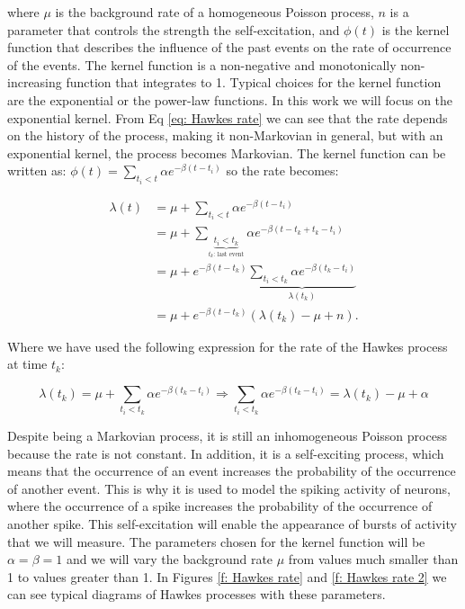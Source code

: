 where $\mu$ is the background rate of a homogeneous Poisson process, $n$ is a parameter that controls the strength the self-excitation, and $\phi(t)$ is the kernel function that
describes the influence of the past events on the rate of occurrence of the events. The kernel function is a non-negative and monotonically non-increasing function that integrates to 1.
Typical choices for the kernel function are the exponential or the power-law functions. In this work we will focus on the exponential kernel. 
From Eq \ref{eq: Hawkes rate} we can see that the rate depends on the history of the process, making it non-Markovian in general, but with an exponential kernel, the process becomes
Markovian. The kernel function can be written as: $\phi(t)=\sum_{t_i<t}\alpha e^{-\beta(t-t_i)}$ so the rate becomes:

\begin{equation}
    \begin{split}
        \lambda(t) &= \mu + \sum_{t_i<t}\alpha e^{-\beta(t-t_i)}\\
        &= \mu + \sum_{\underbrace{t_i<t_k}_{t_k\text{: last event}}}\alpha e^{-\beta(t-t_k+t_k-t_i)}\\
        &= \mu + e^{-\beta(t-t_k)}\underbrace{\sum_{t_i<t_k}\alpha e^{-\beta(t_k-t_i)}}_{\lambda(t_k)}\\
        &= \mu + e^{-\beta(t-t_k)}\left( \lambda(t_k)-\mu+n \right).
    \end{split}
    \label{eq: Hawkes rate exponential becomes Markovian}
\end{equation}

Where we have used the following expression for the rate of the Hawkes process at time $t_k$:

\begin{equation}
    \lambda(t_k) =\mu+\sum_{t_i<t_k}\alpha e^{-\beta(t_k-t_i)}\Rightarrow\sum_{t_i<t_k}\alpha e^{-\beta(t_k-t_i)} = \lambda(t_k)-\mu+\alpha
    \label{eq: Hawkes rate at event time}
\end{equation}

Despite being a Markovian process, it is still an inhomogeneous Poisson process because the rate is not constant. In addition, it is a self-exciting process, which means that the occurrence
of an event increases the probability of the occurrence of another event. This is why it is used to model the spiking activity of neurons, where the occurrence of a spike increases the
probability of the occurrence of another spike. This self-excitation will enable the appearance of bursts of activity that we will measure. The parameters chosen for the kernel function 
will be $\alpha=\beta=1$ and we will vary the background rate $\mu$ from values much smaller than 1 to values greater than 1. In Figures \ref{f: Hawkes rate} and \ref{f: Hawkes rate 2}
we can see typical diagrams of Hawkes processes with these parameters.

